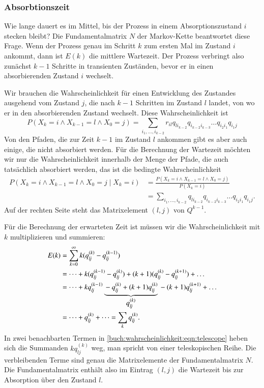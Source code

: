 \subsubsection{Absorbtionszeit}
Wie lange dauert es im Mittel, bis der Prozess in einem
Absorptionszustand $i$ stecken bleibt?
%
Die Fundamentalmatrix $N$ der Markov-Kette beantwortet diese
Frage.
Wenn der Prozess genau im Schritt $k$ zum ersten Mal im Zustand $i$
ankommt, dann ist $E(k)$ die mittlere Wartezeit.
Der Prozess verbringt also zunächst $k-1$ Schritte in transienten
Zuständen, bevor er in einen absorbierenden Zustand $i$ wechselt.

Wir brauchen die Wahrscheinlichkeit für einen Entwicklung des Zustandes
ausgehend vom Zustand $j$, die nach $k-1$ Schritten im Zustand $l$
landet, von wo er in den absorbierenden Zustand wechselt.
Diese Wahrscheinlichkeit ist
\[
P(X_k = i\wedge X_{k-1} = l \wedge X_0=j)
=
\sum_{i_1,\dots,i_{k-2}}
r_{il} q_{li_{k-2}} q_{i_{k-2}i_{k-3}}\dots q_{i_2i_1} q_{i_1j}
\]
Von den Pfaden, die zur Zeit $k-1$ im Zustand $l$ ankommen gibt es
aber auch einige, die nicht absorbiert werden.
Für die Berechnung der Wartezeit möchten wir nur die Wahrscheinlichkeit
innerhalb der Menge der Pfade, die auch tatsächlich absorbiert werden,
das ist die bedingte Wahrscheinlichkeit
\begin{equation}
\begin{aligned}
P(X_k = i\wedge X_{k-1} = l \wedge X_0=j\mid X_k=i)
&=
\frac{
P(X_k = i\wedge X_{k-1} = l \wedge X_0=j)
}{
P(X_k=i)
}
\\
&=
\sum_{i_1,\dots,i_{k-2}}
q_{li_{k-2}} q_{i_{k-2}i_{k-3}}\dots q_{i_2i_1} q_{i_1j}.
\end{aligned}
\label{buch:wahrscheinlichkeit:eqn:ankunftswahrscheinlichkeit}
\end{equation}
Auf der rechten Seite steht das Matrixelement $(l,j)$ von $Q^{k-1}$.


Für die Berechnung der erwarteten Zeit ist müssen wir die
Wahrscheinlichkeit mit $k$ multiplizieren und summieren:
\begin{align}
E(k)
&=
\sum_{k=0}^\infty
k(
q^{(k)}_{l\!j} 
-
q^{(k-1)}_{l\!j} 
)
\notag
\\
&=
\dots
+
k(
q^{(k-1)}_{l\!j} 
-
q^{(k)}_{l\!j} 
)
+
(k+1)(
q^{(k)}_{l\!j} 
-
q^{(k+1)}_{l\!j} 
)
+
\dots
\label{buch:wahrscheinlichkeit:eqn:telescope}
\\
&=
\dots
+
k
q^{(k-1)}_{l\!j} 
\underbrace{
\mathstrut
-
q^{(k)}_{l\!j} 
+
(k+1)
q^{(k)}_{l\!j} }_{\displaystyle q^{(k)}_{l\!j}}
\mathstrut
-
(k+1)
q^{(k+1)}_{l\!j} 
+
\dots
\\
&=
\dots
+
q^{(k)}_{l\!j}
+
\dots
=
\sum_{k} q^{(k)}_{l\!j}.
\notag
\end{align}
In zwei benachbarten Termen in 
\eqref{buch:wahrscheinlichkeit:eqn:telescope}
heben sich die Summanden $kq^{(k)}_{l\!j}$ weg, man spricht von
einer teleskopischen Reihe.
%
Die verbleibenden Terme sind genau die Matrixelemente der Fundamentalmatrix $N$.
Die Fundamentalmatrix enthält also im Eintrag $(l,j)$ die Wartezeit
bis zur Absorption über den Zustand $l$.

